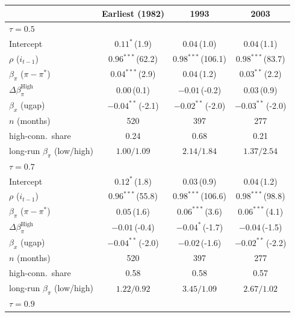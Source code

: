 \setlength{\tabcolsep}{4pt}\scriptsize
\begin{tabular}{lccc}
\toprule
 & Earliest (1982) & 1993 & 2003 \\
\midrule
\multicolumn{4}{l}{\textit{$\tau=0.5$}} \\
Intercept & $0.11^{*}$\,{\scriptsize(1.9)} & $0.04$\,{\scriptsize(1.0)} & $0.04$\,{\scriptsize(1.1)} \\
$\rho$ ($i_{t-1}$) & $0.96^{***}$\,{\scriptsize(62.2)} & $0.98^{***}$\,{\scriptsize(106.1)} & $0.98^{***}$\,{\scriptsize(83.7)} \\
$\beta_\pi$ ($\pi-\pi^*$) & $0.04^{***}$\,{\scriptsize(2.9)} & $0.04$\,{\scriptsize(1.2)} & $0.03^{**}$\,{\scriptsize(2.2)} \\
$\Delta\beta_\pi^{\text{High}}$ & $0.00$\,{\scriptsize(0.1)} & $-0.01$\,{\scriptsize(-0.2)} & $0.03$\,{\scriptsize(0.9)} \\
$\beta_x$ (ugap) & $-0.04^{**}$\,{\scriptsize(-2.1)} & $-0.02^{**}$\,{\scriptsize(-2.0)} & $-0.03^{**}$\,{\scriptsize(-2.0)} \\
\addlinespace
$n$ (months) & 520 & 397 & 277 \\
high-conn.\ share & 0.24 & 0.68 & 0.21 \\
long-run $\beta_\pi$ (low/high) & $1.00/1.09$ & $2.14/1.84$ & $1.37/2.54$ \\
\midrule
\multicolumn{4}{l}{\textit{$\tau=0.7$}} \\
Intercept & $0.12^{*}$\,{\scriptsize(1.8)} & $0.03$\,{\scriptsize(0.9)} & $0.04$\,{\scriptsize(1.2)} \\
$\rho$ ($i_{t-1}$) & $0.96^{***}$\,{\scriptsize(55.8)} & $0.98^{***}$\,{\scriptsize(106.6)} & $0.98^{***}$\,{\scriptsize(98.8)} \\
$\beta_\pi$ ($\pi-\pi^*$) & $0.05$\,{\scriptsize(1.6)} & $0.06^{***}$\,{\scriptsize(3.6)} & $0.06^{***}$\,{\scriptsize(4.1)} \\
$\Delta\beta_\pi^{\text{High}}$ & $-0.01$\,{\scriptsize(-0.4)} & $-0.04^{*}$\,{\scriptsize(-1.7)} & $-0.04$\,{\scriptsize(-1.5)} \\
$\beta_x$ (ugap) & $-0.04^{**}$\,{\scriptsize(-2.0)} & $-0.02$\,{\scriptsize(-1.6)} & $-0.02^{**}$\,{\scriptsize(-2.2)} \\
\addlinespace
$n$ (months) & 520 & 397 & 277 \\
high-conn.\ share & 0.58 & 0.58 & 0.57 \\
long-run $\beta_\pi$ (low/high) & $1.22/0.92$ & $3.45/1.09$ & $2.67/1.02$ \\
\midrule
\multicolumn{4}{l}{\textit{$\tau=0.9$}} \\

\end{tabular}
